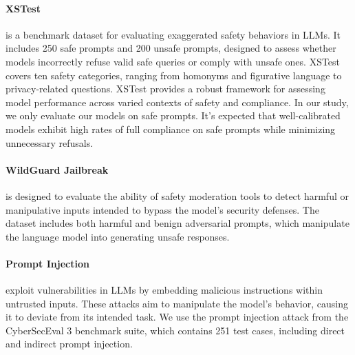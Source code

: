 \paragraph{XSTest~\cite{rottger2023xstest}} 
is a benchmark dataset for evaluating exaggerated safety behaviors in LLMs. It includes 250 safe prompts and 200 unsafe prompts, designed to assess whether models incorrectly refuse valid safe queries or comply with unsafe ones. 
XSTest covers ten safety categories, ranging from homonyms and figurative language to privacy-related questions. XSTest provides a robust framework for assessing model performance across varied contexts of safety and compliance. In our study, we only evaluate our models on safe prompts. It's expected that well-calibrated models exhibit high rates of full compliance on safe prompts while minimizing unnecessary refusals.

\paragraph{WildGuard Jailbreak~\cite{wildguard2024}} is designed to evaluate the ability of safety moderation tools to detect harmful or manipulative inputs intended to bypass the model's security defenses. The dataset includes both harmful and benign adversarial prompts, which manipulate the language model into generating unsafe responses.

\paragraph{Prompt Injection~\cite{wan2024cyberseceval3advancingevaluation}} exploit vulnerabilities in LLMs by embedding malicious instructions within untrusted inputs. These attacks aim to manipulate the model's behavior, causing it to deviate from its intended task. 
We use the prompt injection attack from the CyberSecEval 3 benchmark suite, which contains 251 test cases, including direct and indirect prompt injection. 


